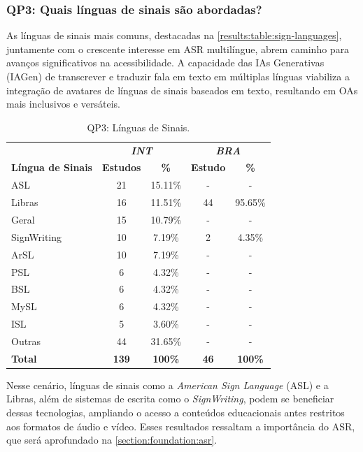 \subsubsection{QP3: Quais línguas de sinais são abordadas?}


As línguas de sinais mais comuns, destacadas na \autoref{results:table:sign-languages}, juntamente com o crescente interesse em ASR multilíngue, abrem caminho para avanços significativos na acessibilidade. A capacidade das IAs Generativas (IAGen) de transcrever e traduzir fala em texto em múltiplas línguas viabiliza a integração de avatares de línguas de sinais baseados em texto, resultando em OAs mais inclusivos e versáteis.

\begin{table}[htb]
\caption{QP3: Línguas de Sinais.}
\label{results:table:sign-languages}
\centering
\begin{tabular}{l|cc|cc} \hline
 & \multicolumn{2}{c|}{\textit{\textbf{INT}}} & \multicolumn{2}{c}{\textit{\textbf{BRA}}} \\ \cline{2-5} 
\textbf{Língua de Sinais} & \textbf{Estudos} & \textbf{\%} & \textbf{Estudo} & \textbf{\%} \\ \hline
ASL & 21 & 15.11\% & - & - \\
Libras & 16 & 11.51\% & 44 & 95.65\% \\
Geral & 15 & 10.79\% & - & - \\
SignWriting & 10 & 7.19\% & 2 & 4.35\% \\
ArSL & 10 & 7.19\% & - & - \\
PSL & 6 & 4.32\% & - & - \\
BSL & 6 & 4.32\% & - & - \\
MySL & 6 & 4.32\% & - & - \\
ISL & 5 & 3.60\% & - & - \\
Outras & 44 & 31.65\% & - & - \\ \hline
\textbf{Total} & \textbf{139} & \textbf{100\%} & \textbf{46} & \textbf{100\%} \\ \hline
\end{tabular}
\end{table}

Nesse cenário, línguas de sinais como a \textit{American Sign Language} (ASL) e a Libras, além de sistemas de escrita como o \textit{SignWriting}, podem se beneficiar dessas tecnologias, ampliando o acesso a conteúdos educacionais antes restritos aos formatos de áudio e vídeo. Esses resultados ressaltam a importância do ASR, que será aprofundado na \autoref{section:foundation:asr}.

